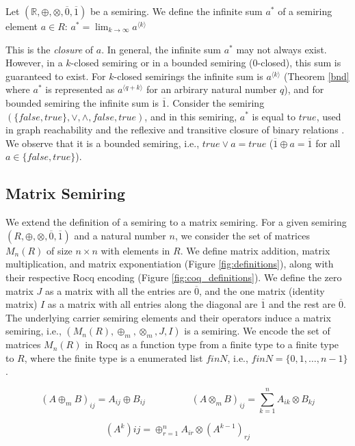 \documentclass[a4paper,UKenglish,cleveref, autoref, thm-restate, anonymous]{lipics-v2021}
\begin{document}
\begin{definition}\label{def:inf_sum}
    Let  \( (\mathbb{R}, \oplus, \otimes, \overline{0}, \overline{1}) \)  be a semiring. We define the infinite sum $a^{*}$  of a semiring element  $a \in R$: $a^{*} = \lim_{k\to\infty} a^{\langle k \rangle}$
    
\end{definition}



This is the \textit{closure} of $a$. In general, the infinite sum $a^{*}$ may not always exist. However, in a $k$-closed semiring or 
in a bounded semiring ($0$-closed), this sum is guaranteed to exist. For $k$-closed semirings the infinite sum is $a^{\langle k \rangle}$
(Theorem \ref{bnd} where $a^{*}$ is represented as $a^{\langle q + k \rangle}$ for an arbirary natural number $q$), and 
for bounded semiring the infinite sum is $\overline{1}$. 
Consider the semiring \( (\{false, true\}, \lor, \land, false, true)\), and  in this semiring, 
 $a^{*}$ is equal to $true$, used in graph reachability and the reflexive and transitive closure of binary relations \cite{abdali1985transitive}. We observe that it is a bounded semiring, i.e., 
$true \lor a = true$ ($\overline{1} \oplus a =\overline{1}$ for all $a \in \{false, true\}$).



\subsection{Matrix Semiring}\label{sec:matrix}
We extend the definition of a semiring to a matrix semiring. For a given semiring $(R, \oplus, \otimes, \overline{0}, \overline{1})$ and a natural number $n$, we consider the set of matrices $M_{n}(R)$ of size $n \times n$ with elements in $R$. We define matrix addition, matrix multiplication, and matrix exponentiation (Figure \ref{fig:definitions}), along with their respective Rocq encoding (Figure \ref{fig:coq_definitions}).
We define the zero matrix $J$ as a matrix 
with all the entries are $\overline{0}$, and the one matrix (identity matrix) 
$I$ as a matrix with all entries along the diagonal are $\overline{1}$ 
and the rest are $\overline{0}$. The underlying carrier semiring elements and 
their operators induce a 
matrix semiring, i.e., $(M_{n}(R), \oplus_{m}, \otimes_{m}, J, I)$ is a semiring.
We encode the set of matrices $M_{n}(R)$ in Rocq as a function type from a finite type to a finite type to \(R\), 
where the finite type is a enumerated list  $finN$, i.e., $finN = \{0, 1, \dots, n-1\}$.
\vspace{-2mm}
\begin{center}
\begin{minipage}{0.7\linewidth}
   \[  (A \oplus_{m} B)_{ij} = A_{ij} \oplus B_{ij} \hspace{2cm} (A \otimes_{m} B)_{ij} = \sum_{k=1}^{n} A_{ik} \otimes B_{kj} \] 
\end{minipage}


\begin{minipage}[t]{0.5\linewidth}
\[(A^k){ij} = \oplus_{r=1}^{n} A_{ir} \otimes (A^{k-1})_{rj}\]
\end{minipage}
\end{center}
\end{document}
